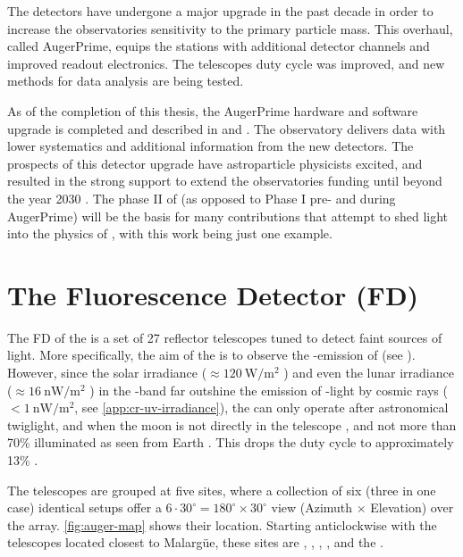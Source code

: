 The detectors have undergone a major upgrade in the past decade in order to 
increase the observatories sensitivity to the primary particle mass. This 
overhaul, called AugerPrime, equips the \SD stations with additional detector 
channels and improved readout electronics. The \FD telescopes duty cycle was 
improved, and new methods for data analysis are being tested.

As of the completion of this thesis, the AugerPrime hardware and software 
upgrade is completed and described in  and 
\cite{collaborationPierreAugerObservatory2011}. The observatory delivers data 
with lower systematics and additional information from the new detectors. The 
prospects of this detector upgrade have astroparticle physicists excited, and 
resulted in the strong support to extend the observatories funding until beyond
the year 2030 \cite{castellinaOutcomeFinanceBoard2023}. The phase II of \DAQ (as
opposed to Phase I pre- and during AugerPrime) will be the basis for many 
contributions that attempt to shed light into the physics of \UHECRs, with this 
work being just one example.

\section{The Fluorescence Detector (FD)}
\label{sesee}

The \acf{FD} of the \PAO is a set of 27 reflector telescopes tuned to detect 
faint sources of \UV light. More specifically, the aim of the \FD is to observe
the \UV-emission of \EAS (see ). However, since the 
solar irradiance ($\approx\SI{120}{\watt\per\meter\squared}$ 
\cite{leanContributionUltravioletIrradiance1989}) and even the lunar irradiance 
($\approx\SI{16}{\nano\watt\per\meter\squared}$
\cite{snowAbsoluteUltravioletIrradiance2013}) in the \UV-band far outshine the 
emission of \UV-light by cosmic rays ($<\SI{1}{\nano\watt\per\meter\squared}$, 
see \cref{app:cr-uv-irradiance}), the \FD can only operate after astronomical 
twiglight, and when the moon is not directly in the telescope \FOV, and not
more than 70\% illuminated as seen from Earth \cite{mathesCriteriaFDShift}. This
drops the duty cycle to approximately 13\% 
\cite{abrahamFluorescenceDetectorPierre2010}.

The telescopes are grouped at five \FD sites, where a collection of six (three
in one case) identical setups offer a $6\cdot30^\circ=180^\circ\times30^\circ$ 
view (Azimuth $\times$ Elevation) over the \SD array. \cref{fig:auger-map} shows
their location. Starting anticlockwise with the telescopes located closest to 
Malargüe, these sites are \LL, \LM, \LA, , and the \HEAT.

